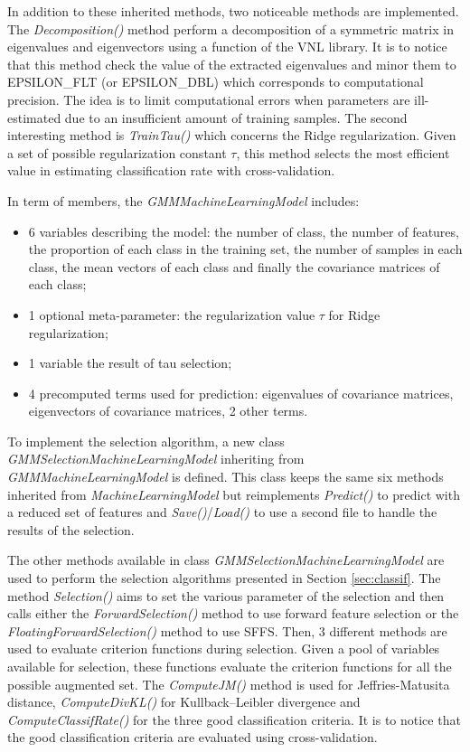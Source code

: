 \documentclass[a4paper,11pt,DIV=16,abstracton]{scrartcl}
\begin{document}
    In addition to these inherited methods, two noticeable methods are implemented. The \emph{Decomposition()} method perform a decomposition of a symmetric matrix in eigenvalues and eigenvectors using a function of the VNL library. It is to notice that this method check the value of the extracted eigenvalues and minor them to EPSILON\_FLT (or EPSILON\_DBL) which corresponds to computational precision.  The idea is to limit computational errors when parameters are ill-estimated due to an insufficient amount of training samples. The second interesting method is \emph{TrainTau()} which concerns the Ridge regularization. Given a set of possible regularization constant $\tau$, this method selects the most efficient value in estimating classification rate with cross-validation.

    In term of members, the \emph{GMMMachineLearningModel} includes:
    \begin{itemize}
        \item 6 variables describing the model: the number of class, the number of features, the proportion of each class in the training set, the number of samples in each class, the mean vectors of each class and finally the covariance matrices of each class;
        \item 1 optional meta-parameter: the regularization value $\tau$ for Ridge regularization;
        \item 1 variable the result of tau selection;
        \item 4 precomputed terms used for prediction: eigenvalues of covariance matrices, eigenvectors of covariance matrices, 2 other terms.
    \end{itemize}

    To implement the selection algorithm, a new class \emph{GMMSelectionMachineLearningModel} inheriting from \emph{GMMMachineLearningModel} is defined. This class keeps the same six methods inherited from \emph{MachineLearningModel} but reimplements \emph{Predict()} to predict with a reduced set of features and  \emph{Save()}/\emph{Load()} to use a second file to handle the results of the selection.

    The other methods available in class \emph{GMMSelectionMachineLearningModel} are used to perform the selection algorithms presented in Section \ref{sec:classif}. The method \emph{Selection()} aims to set the various parameter of the selection and then calls either the \emph{ForwardSelection()} method to use forward feature selection or the \emph{FloatingForwardSelection()} method to use SFFS. Then, 3 different methods are used to evaluate criterion functions during selection. Given a pool of variables available for selection, these functions evaluate the criterion functions for all the possible augmented set. The \emph{ComputeJM()} method is used for Jeffries-Matusita distance, \emph{ComputeDivKL()} for Kullback–Leibler divergence and \emph{ComputeClassifRate()} for the three good classification criteria. It is to notice that the good classification criteria are evaluated using cross-validation.
\end{document}
